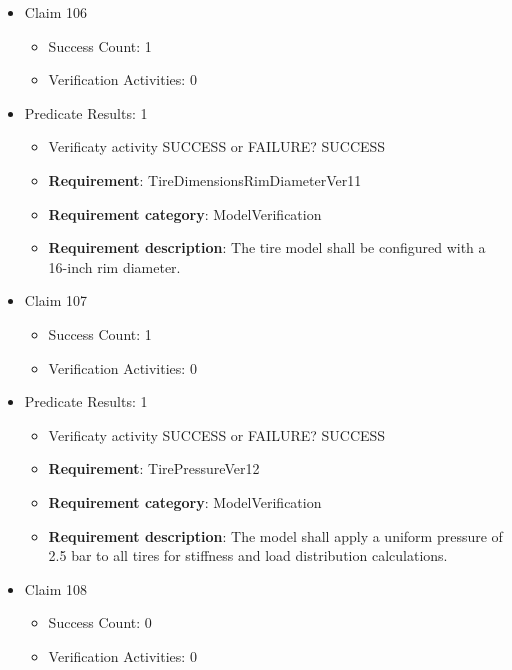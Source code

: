 \documentclass{article}
\begin{document}
\begin{itemize}
  				  \item Claim 106
				\begin{itemize}
			    	\item Success Count: 1 
			    	\item Verification Activities: 0
				\end{itemize}
				
									    
				\item Predicate Results: 1
					\begin{itemize}				
					\item Verificaty activity SUCCESS or FAILURE? SUCCESS
					
					\item \textbf{Requirement}: TireDimensionsRimDiameterVer11 
					\item \textbf{Requirement category}: ModelVerification
					\item \textbf{Requirement description}: The tire model shall be configured with a 16-inch rim diameter.
					\end{itemize}

  				  \item Claim 107
				\begin{itemize}
			    	\item Success Count: 1 
			    	\item Verification Activities: 0
				\end{itemize}
				
									    
				\item Predicate Results: 1
					\begin{itemize}				
					\item Verificaty activity SUCCESS or FAILURE? SUCCESS
					
					\item \textbf{Requirement}: TirePressureVer12 
					\item \textbf{Requirement category}: ModelVerification
					\item \textbf{Requirement description}: The model shall apply a uniform pressure of 2.5 bar to all tires for stiffness and load distribution calculations.
					\end{itemize}

  				  \item Claim 108
				\begin{itemize}
			    	\item Success Count: 0 
			    	\item Verification Activities: 0
				\end{itemize}
				

\end{itemize}
\end{document}
